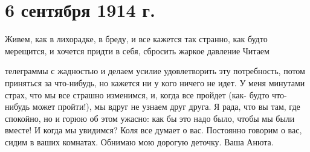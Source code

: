 \section{6 сентября 1914 г.}


Живем, как в лихорадке, в бреду, и все кажется так странно, как будто
мерещится, и хочется придти в себя, сбросить жаркое давление \textellipsis{}
Читаем


\noindent
телеграммы с жадностью и делаем усилие удовлетворить эту потребность, потом
приняться за что-нибудь, но \textellipsis{} кажется ни у кого ничего не идет. У
меня минутами страх, что мы все страшно изменимся, и, когда все пройдет (как-
будто что-нибудь может пройти!), мы вдруг не узнаем друг друга. Я рада, что вы
там, где спокойно, но и горюю об этом ужасно: как бы это надо было, чтобы мы
были вместе! И когда мы увидимся? Коля все думает о вас. Постоянно говорим о
вас, сидим в ваших комнатах. Обнимаю мою дорогую деточку. Ваша Анюта.
